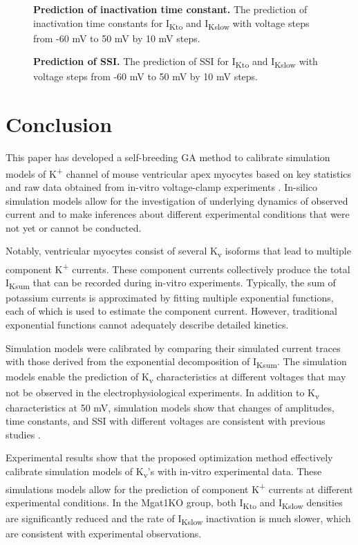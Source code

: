 \documentclass[10pt,letterpaper]{article}
\begin{document}
\begin{figure}[!ht]
    \centering
    \caption{{\bf Prediction of inactivation time constant.} 
    The prediction of inactivation time constants for I\textsubscript{Kto} and I\textsubscript{Kslow} with voltage steps from -60 mV to 50 mV by 10 mV steps.} 
    \label{fig9}
\end{figure}

\begin{figure}[!ht]
    \centering
    \caption{{\bf Prediction of SSI.} The prediction of SSI for I\textsubscript{Kto} and I\textsubscript{Kslow} with voltage steps from -60 mV to 50 mV by 10 mV steps.} 
    \label{fig10}
\end{figure}

\section*{Conclusion}
This paper has developed a self-breeding GA method to calibrate simulation models of K\textsuperscript{+} channel of mouse ventricular apex myocytes based on key statistics and raw data obtained from in-vitro voltage-clamp experiments \cite{ednie2019reduced}. In-silico simulation models allow for the investigation of underlying dynamics of observed current and to make inferences about different experimental conditions that were not yet or cannot be conducted.

Notably, ventricular myocytes consist of several K\textsubscript{v} isoforms that lead to multiple component K\textsuperscript{+} currents. These component currents collectively produce the total I\textsubscript{Ksum} that can be recorded during in-vitro experiments. Typically, the sum of potassium currents is approximated by fitting multiple exponential functions, each of which is used to estimate the component current. However, traditional exponential functions cannot adequately describe detailed kinetics.

Simulation models were calibrated by comparing their simulated current traces with those derived from the exponential decomposition of I\textsubscript{Ksum}. The simulation models enable the prediction of K\textsubscript{v} characteristics at different voltages that may not be observed in the electrophysiological experiments. In addition to K\textsubscript{v} characteristics at 50 mV, simulation models show that changes of amplitudes, time constants, and SSI with different voltages are consistent with previous studies \cite{ednie2019reduced}.

Experimental results show that the proposed optimization method effectively calibrate simulation models of K\textsubscript{v}'s with in-vitro experimental data. These simulations models allow for the prediction of component K\textsuperscript{+} currents at different experimental conditions. In the Mgat1KO group, both I\textsubscript{Kto} and I\textsubscript{Kslow} densities are significantly reduced and the rate of I\textsubscript{Kslow} inactivation is much slower, which are consistent with experimental observations.
\end{document}

